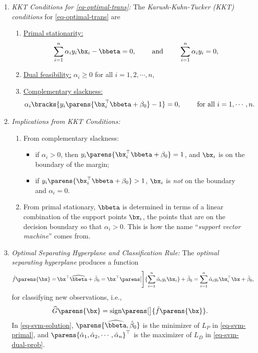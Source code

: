 \documentclass[12pt]{article}
\begin{document}
\begin{enumerate}[label=\textbf{\arabic*.}]
\begin{enumerate}
		\item \textit{KKT Conditions for \eqref{eq-optimal-trans}:} The \emph{Karush-Kuhn-Tucker (KKT) conditions} for \eqref{eq-optimal-trans} are 
		\begin{enumerate}
			\item \underline{Primal stationarity:} 
			\begin{align*}
				\sum_{i=1}^n \alpha_i y_i \bx_i - \bbeta = 0, \qquad \text{ and } \qquad \sum_{i=1}^n \alpha_i y_i = 0, 
			\end{align*}
			\item \underline{Dual feasibility:} $\alpha_i \ge 0$ for all $i = 1, 2, \cdots, n$, 
			\item \underline{Complementary slackness:} 
			\begin{align*}
				\alpha_i \bracks{ y_i \parens{\bx_i^\top \bbeta + \beta_0} - 1 } = 0, \qquad \text{ for all } i = 1, \cdots, n. 
			\end{align*}
		\end{enumerate}
		
		\item \textit{Implications from KKT Conditions:} 
		\begin{enumerate}
			\item From complementary slackness: 
			\begin{itemize}
				\item if $\alpha_i > 0$, then $y_i \parens{\bx_i^\top \bbeta + \beta_0} = 1$, and $\bx_i$ is on the boundary of the margin; 
				\item if $y_i \parens{\bx_i^\top \bbeta + \beta_0} > 1$, $\bx_i$ is \emph{not} on the boundary and $\alpha_i = 0$. 
			\end{itemize}
			
			\item From primal stationary, $\bbeta$ is determined in terms of a linear combination of the support points $\bx_i$, the points that are on the decision boundary so that $\alpha_i > 0$. This is how the name ``\textit{support vector machine}'' comes from. 
		\end{enumerate}
		
		\item \textit{Optimal Separating Hyperplane and Classification Rule:} The \emph{optimal separating hyperplane} produces a function 
		\begin{align}\label{eq-svm-solution}
			\hat{f} \parens{\bx} = & \, \bx^\top \widehat{\bbeta} + \hat{\beta}_0 
			= \bx^\top \parens[\Bigg]{\sum_{i=1}^n \hat{\alpha}_i y_i \bx_i} + \hat{\beta}_0 
			= \sum_{i=1}^n \hat{\alpha}_i y_i \bx_i^\top \bx + \hat{\beta}_0, 
		\end{align}
		for classifying new observations, i.e., 
		\begin{align*}
			\widehat{G} \parens{\bx} = \mathrm{sign} \parens[\big]{\hat{f} \parens{\bx}}. 
		\end{align*}
		In \eqref{eq-svm-solution}, $\parens{\widehat{\bbeta}, \hat{\beta}_0}$ is the minimizer of $L_P$ in \eqref{eq-svm-primal}, and $\parens{\hat{\alpha}_1, \hat{\alpha}_2, \cdots, \hat{\alpha}_n}^\top$ is the maximizer of $L_D$ in \eqref{eq-svm-dual-prob}. 
		

\end{enumerate}
\end{enumerate}
\end{document}
